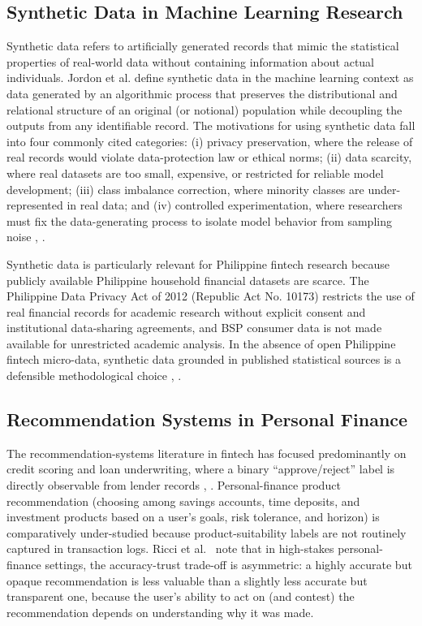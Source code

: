 \documentclass[journal]{./IEEE/IEEEtran}
\begin{document}
\subsection{Synthetic Data in Machine Learning Research}

Synthetic data refers to artificially generated records that mimic the statistical properties of real-world data without containing information about actual individuals. Jordon et al. \cite{ref83} define synthetic data in the machine learning context as data generated by an algorithmic process that preserves the distributional and relational structure of an original (or notional) population while decoupling the outputs from any identifiable record. The motivations for using synthetic data fall into four commonly cited categories: (i) privacy preservation, where the release of real records would violate data-protection law or ethical norms; (ii) data scarcity, where real datasets are too small, expensive, or restricted for reliable model development; (iii) class imbalance correction, where minority classes are under-represented in real data; and (iv) controlled experimentation, where researchers must fix the data-generating process to isolate model behavior from sampling noise \cite{ref83}, \cite{ref46}.

Synthetic data is particularly relevant for Philippine fintech research because publicly available Philippine household financial datasets are scarce. The Philippine Data Privacy Act of 2012 (Republic Act No. 10173) \cite{ref45} restricts the use of real financial records for academic research without explicit consent and institutional data-sharing agreements, and BSP consumer data is not made available for unrestricted academic analysis. In the absence of open Philippine fintech micro-data, synthetic data grounded in published statistical sources is a defensible methodological choice \cite{ref46}, \cite{ref83}.

\subsection{Recommendation Systems in Personal Finance}

The recommendation-systems literature in fintech has focused predominantly on credit scoring and loan underwriting, where a binary ``approve/reject'' label is directly observable from lender records \cite{ref56}, \cite{ref57}. Personal-finance product recommendation (choosing among savings accounts, time deposits, and investment products based on a user's goals, risk tolerance, and horizon) is comparatively under-studied because product-suitability labels are not routinely captured in transaction logs. Ricci et al.\ \cite{ref13} note that in high-stakes personal-finance settings, the accuracy-trust trade-off is asymmetric: a highly accurate but opaque recommendation is less valuable than a slightly less accurate but transparent one, because the user's ability to act on (and contest) the recommendation depends on understanding why it was made.
\end{document}
